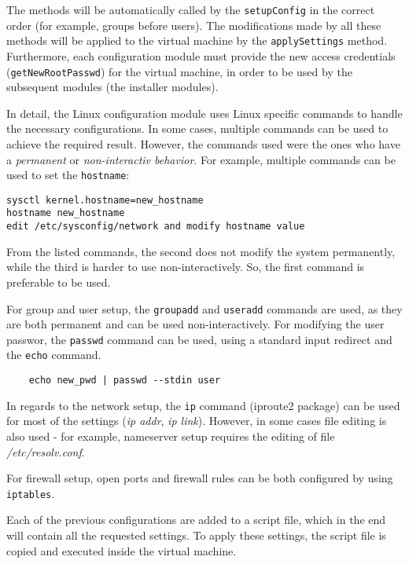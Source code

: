 The methods will be automatically called by the \texttt{setupConfig} 
in the correct order (for example, groups before users). The modifications made 
by all these methods will be applied to the virtual machine by the 
\texttt{applySettings} method. Furthermore, each configuration module must 
provide the new access credentials (\texttt{getNewRootPasswd}) for the virtual 
machine, in order to be used by the subsequent modules (the installer modules).

In detail, the Linux configuration module uses Linux specific commands to 
handle the necessary configurations. In some cases, multiple commands can be 
used to achieve the required result. However, the commands used were the ones 
who have a \emph{permanent} or \emph{non-interactiv behavior}. For example, multiple commands 
can be used to set the \texttt{hostname}:
\\
\lstset{language=bash,caption=Set hostname on Linux systems,label=lst:set-hostname}
\begin{lstlisting}
sysctl kernel.hostname=new_hostname
hostname new_hostname
edit /etc/sysconfig/network and modify hostname value
\end{lstlisting}

From the listed commands, the second does not modify the system permanently, 
while the third is harder to use non-interactively. So, the first command is 
preferable to be used.

For group and user setup, the \texttt{groupadd} and \texttt{useradd} commands 
are used, as they are both permanent and can be used non-interactively. For 
modifying the user passwor, the \texttt{passwd} command can be used, using a 
standard input redirect and the \texttt{echo} command.
\\
\lstset{language=Python,caption=Set user password non-interactively,
label=lst:user-pwd}
\begin{lstlisting}
	echo new_pwd | passwd --stdin user
\end{lstlisting}

In regards to the network setup, the \texttt{ip} command (iproute2 package) 
can be used for most of the settings (\emph{ip addr}, \emph{ip link}). However, in some 
cases file editing is also used - for example, nameserver setup requires the 
editing of file \emph{/etc/resolv.conf}.

For firewall setup, open ports and firewall rules can be both configured by 
using \texttt{iptables}.

Each of the previous configurations are added to a script file, which in the 
end will contain all the requested settings. To apply these settings, the 
script file is copied and executed inside the virtual machine.

